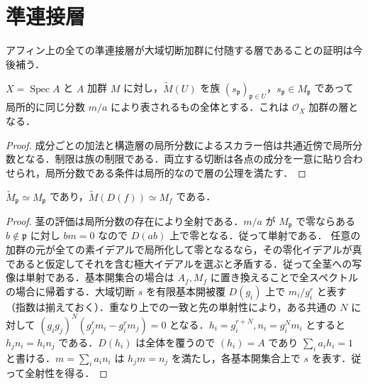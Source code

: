 \section{準連接層}
アフィン上の全ての準連接層が大域切断加群に付随する層であることの証明は今後補う．
\begin{defn}[加群に付随する層]
$X=\operatorname{Spec}A$ と $A$ 加群 $M$ に対し，$\widetilde M(U)$ を族 $(s_{\mathfrak p})_{\mathfrak p\in U}$，$s_{\mathfrak p}\in M_{\mathfrak p}$ であって局所的に同じ分数 $m/a$ により表されるもの全体とする．これは $\mathcal O_X$ 加群の層となる．
\end{defn}
\begin{proof}
成分ごとの加法と構造層の局所分数によるスカラー倍は共通近傍で局所分数となる．制限は族の制限である．両立する切断は各点の成分を一意に貼り合わせられ，局所分数である条件は局所的なので層の公理を満たす．
\end{proof}
\begin{prop}[茎と基本開集合の切断]
$\widetilde M_{\mathfrak p}\simeq M_{\mathfrak p}$ であり，$\widetilde M(D(f))\simeq M_f$ である．
\end{prop}
\begin{proof}
茎の評価は局所分数の存在により全射である．$m/a$ が $M_{\mathfrak p}$ で零ならある $b\notin\mathfrak p$ に対し $bm=0$ なので $D(ab)$ 上で零となる．従って単射である．
任意の加群の元が全ての素イデアルで局所化して零となるなら，その零化イデアルが真であると仮定してそれを含む極大イデアルを選ぶと矛盾する．従って全茎への写像は単射である．基本開集合の場合は $A_f,M_f$ に置き換えることで全スペクトルの場合に帰着する．大域切断 $s$ を有限基本開被覆 $D(g_i)$ 上で $m_i/g_i^r$ と表す（指数は揃えておく）．重なり上での一致と先の単射性により，ある共通の $N$ に対して $(g_i g_j)^N(g_j^r m_i-g_i^r m_j)=0$ となる．$h_i=g_i^{r+N},n_i=g_i^Nm_i$ とすると $h_jn_i=h_in_j$ である．$D(h_i)$ は全体を覆うので $(h_i)=A$ であり $\sum_i a_ih_i=1$ と書ける．$m=\sum_i a_i n_i$ は $h_jm=n_j$ を満たし，各基本開集合上で $s$ を表す．従って全射性を得る．
\end{proof}
